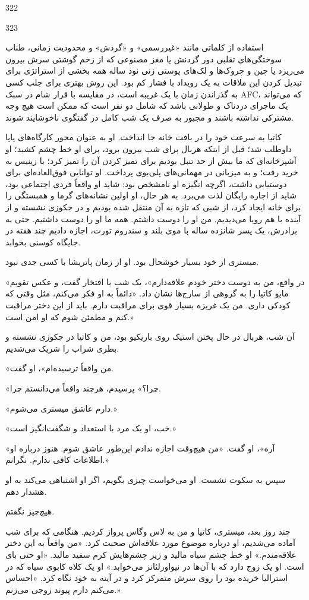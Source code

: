 322

323

استفاده از کلماتی مانند «غیررسمی» و «گردش» و محدودیت زمانی، طناب سوختگی‌های تقلبی دور گردنش یا مغز مصنوعی که از زخم گوشتی سرش بیرون می‌ریزد یا چین و چروک‌ها و لک‌های پوستی زنی نود ساله همه بخشی از استراتژی برای تبدیل کردن این ملاقات به یک رویداد با فشار کم بود. این روش بهتری برای جلب کسی به گذراندن زمان با یک غریبه است، در مقایسه با قرار شام در سبک AFC، که می‌تواند یک ماجرای دردناک و طولانی باشد که شامل دو نفر است که ممکن است هیچ وجه مشترکی نداشته باشند و مجبور به صرف یک شب کامل در گفتگوی ناخوشایند شوند.

کاتیا به سرعت خود را در بافت خانه جا انداخت. او به عنوان محور کارگاه‌های پاپا داوطلب شد؛ قبل از اینکه هربال برای شب بیرون برود، برای او خط چشم کشید؛ او آشپزخانه‌ای که ما بیش از حد تنبل بودیم برای تمیز کردن آن را تمیز کرد؛ با زینیس به خرید رفت؛ و به میزبانی در مهمانی‌های پلی‌بوی پرداخت. او توانایی فوق‌العاده‌ای برای دوستیابی داشت، اگرچه انگیزه او نامشخص بود: شاید او واقعاً فردی اجتماعی بود، شاید از اجاره رایگان لذت می‌برد. به هر حال، او اولین نشانه‌های گرما و همبستگی را برای خانه ایجاد کرد، از شبی که تازه به آن منتقل شده بودیم و در جکوزی نشسته و از آینده با هم رویا می‌دیدیم. من او را دوست داشتم. همه ما او را دوست داشتیم. حتی به برادرش، یک پسر شانزده ساله با موی بلند و سندروم تورت، اجازه دادیم چند هفته در جایگاه کوسنی بخوابد.

میستری از خود بسیار خوشحال بود. او از زمان پاتریشا با کسی جدی نبود.

«در واقع، من به دوست دختر خودم علاقه‌دارم»، یک شب با افتخار گفت، و عکس تقویم مایو کاتیا را به گروهی از سارج‌ها نشان داد. «دائماً به او فکر می‌کنم، مثل وقتی که کودکی داری. من یک غریزه بسیار قوی برای مراقبت دارم. باید از این دختر مراقبت کنم و مطمئن شوم که او امن است.»

آن شب، هربال در حال پختن استیک روی باریکیو بود، من و کاتیا در جکوزی نشسته و بطری شراب را شریک می‌شدیم.

«من واقعاً ترسیده‌ام»، او گفت.

«چرا؟» پرسیدم، هرچند واقعاً می‌دانستم چرا.

«دارم عاشق میستری می‌شوم.»

«خب، او یک مرد با استعداد و شگفت‌انگیز است.»

«آره»، او گفت. «من هیچ‌وقت اجازه ندادم این‌طور عاشق شوم. هنوز درباره او اطلاعات کافی ندارم. نگرانم.»

سپس به سکوت نشست. او می‌خواست چیزی بگویم، اگر او اشتباهی می‌کند به او هشدار دهم.

هیچ‌چیز نگفتم.

چند روز بعد، میستری، کاتیا و من به لاس وگاس پرواز کردیم. هنگامی که برای شب آماده می‌شدیم، او درباره موضوع مورد علاقه‌اش صحبت کرد. «من واقعاً به این دختر علاقه‌مندم.» او خط چشم سیاه مالید و زیر چشم‌هایش کرم سفید مالید. «او حتی بای است. او یک زوج دارد که با آن‌ها در نیواورلئانز می‌خوابد.» او یک کلاه کابوی سیاه که در استرالیا خریده بود را روی سرش متمرکز کرد و در آینه به خود نگاه کرد. «احساس می‌کنم دارم پیوند زوجی می‌زنم.»